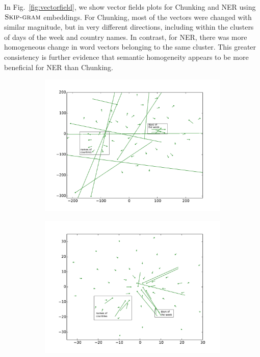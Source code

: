 \documentclass[11pt]{article}
\newcommand{\figref}[2][]{Fig#1.~\ref{#2}\xspace}
\newcommand{\method}[2][]{\ensuremath{\textsc{#2#1}}\xspace}
\newcommand{\Skipgram}[1][]{\method[#1]{Skip-gram}}
\newcommand{\task}[1]{\textsf{#1}\xspace}
\newcommand{\chunking}{\task{Chunking}}
\newcommand{\ner}{\task{NER}}
\begin{document}
In \figref{fig:vectorfield}, we show vector fields plots for \chunking and \ner using \Skipgram embeddings.
For \chunking, most of the vectors were changed with similar magnitude,
but in very different directions, including within the clusters of days of
the week and country names.
In contrast, for \ner, there was more homogeneous change in word vectors
belonging to the same cluster.
This greater consistency is further evidence that semantic homogeneity
appears to be more beneficial for \ner than \chunking. 


\begin{figure}[t!]
\centering
\begin{subfigure}[b]{0.48\textwidth}
	\centering
    \includegraphics[width=\textwidth]{lizhenskipchunking}
	\subcaption{\chunking}	
	\label{fig:skipChu}
\end{subfigure}
\begin{subfigure}[b]{0.48\textwidth}
	\centering
    \includegraphics[width=\textwidth]{lizhenskipner}    	

\end{subfigure}
\end{figure}
\end{document}
